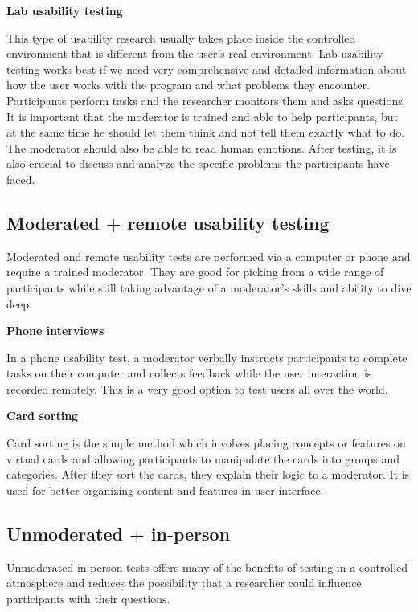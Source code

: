 \documentclass[a4paper,10pt,twoside]{article}
\begin{document}
\smallskip

\noindent \textbf {Lab usability testing}

\noindent This type of usability research usually takes place inside the controlled environment that is different from the user’s real environment. 
Lab usability testing works best if we need very comprehensive and detailed information about how the user works with the program and what problems they encounter. Participants perform tasks and the researcher monitors them and asks questions. It is important that the moderator is trained and able to help participants, but at the same time he should let them think and not tell them exactly what to do. The moderator should also be able to read human emotions. After testing, it is also crucial to discuss and analyze the specific problems the participants have faced.

\subsection{Moderated + remote usability testing}
Moderated and remote usability tests are performed via a computer or phone and require a trained moderator. They are good for picking from a wide range of participants while still taking advantage of a moderator's skills and ability to dive deep.

\smallskip

\noindent \textbf {Phone interviews}

\noindent In a phone usability test, a moderator verbally instructs participants to complete tasks on their computer and collects feedback while the user interaction is recorded remotely. This is a very good option to test users all over the world. 

\smallskip

\noindent \textbf {Card sorting}

\noindent Card sorting is the simple method which involves placing concepts or features on virtual cards and allowing participants to manipulate the cards into groups and categories. After they sort the cards, they explain their logic to a moderator. It is used for better organizing content and features in user interface.

\subsection {Unmoderated + in-person}
Unmoderated in-person tests offers many of the benefits of testing in a controlled atmosphere and reduces the possibility that a researcher could influence participants with their questions.
\end{document}
